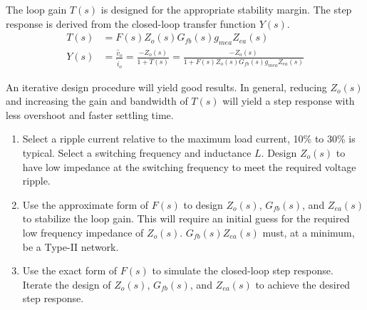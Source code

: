 \documentclass{tufte-handout}
\begin{document}
The loop gain $T(s)$ is designed for the appropriate stability margin.
The step response is derived from the closed-loop transfer function $Y(s)$.
\begin{align*}
T(s)&=F(s)Z_o(s)G_{fb}(s)g_{mea}Z_{ea}(s)\\[0.75em]
Y(s)&=\frac{\widehat{v}_o}{\widehat{i}_o}=\frac{-Z_o(s)}{1+T(s)}=\frac{-Z_o(s)}{1+F(s)Z_o(s)G_{fb}(s)g_{mea}Z_{ea}(s)}
\end{align*}

An iterative design procedure will yield good results.
In general, reducing $Z_o(s)$ and increasing the gain and bandwidth of $T(s)$ will yield a step response with less overshoot and faster settling time.
\begin{enumerate}
\item Select a ripple current relative to the maximum load current, 10\% to 30\% is typical.
Select a switching frequency and inductance $L$.
Design $Z_o(s)$ to have low impedance at the switching frequency to meet the required voltage ripple.
\item Use the approximate form of $F(s)$ to design $Z_o(s)$, $G_{fb}(s)$, and $Z_{ea}(s)$ to stabilize the loop gain.
This will require an initial guess for the required low frequency impedance of $Z_o(s)$. $G_{fb}(s)Z_{ea}(s)$ must, at a minimum, be a Type-II network.
\item Use the exact form of $F(s)$ to simulate the closed-loop step response. Iterate the design of $Z_o(s)$, $G_{fb}(s)$, and $Z_{ea}(s)$ to achieve the desired step response.
\end{enumerate}
\end{document}
